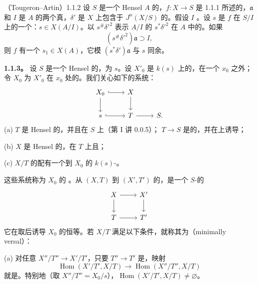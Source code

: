 \begin{SGAresult}{（Tougeron--Artin）}{1.1.2}
设 $S$ 是一个 Hensel  $A$ 的，$f:X\to S$ 是 1.1.1 所述的，$\mathfrak a$ 和 $I$ 是 $A$ 的两个真，$\delta'$ 是 $X$ 上包含于 $J^n(X/S)$ 的。假设 $I$ 。设 $s$ 是 $f$ 在 $S/I$ 上的一个：$s\in X(A/I)$。以 $s^{\#}\delta'^2$ 表示 $A/I$ 的 $s^*\delta'^2$ 在 $A$ 中的。如果
\[
 (s^{\#}\delta'^2)\mathfrak a\supset I,
\]
则 $f$ 有一个 $s_1\in X(A)$，它模 $(s^*\delta')\mathfrak a$ 与 $s$ 同余。
\end{SGAresult}
\textbf{1.1.3。} 设 $S$ 是一个 Hensel 的，为 $s$。设 $X'_0$ 是 $k(s)$ 上的，在一个 $x_0$ 之外；令 $X_0$ 为 $X'_0$ 在 $x_0$ 处的。我们关心如下的系统：
\[
\begin{tikzcd}
X_0\arrow[r,hook]\arrow[d]&X\arrow[d]\\
s\arrow[r,hook]&T\arrow[r]&S .
\end{tikzcd}
\]
(a) $T$ 是 Hensel 的，并且在 $S$ 上（第 I 讲 0.0.5）； $T\to S$ 是的，并在上诱导；

(b) $X$ 是 Hensel 的，在 $T$ 上且；

(c) $X/T$ 的配有一个到 $X_0$ 的 $k(s)$-。

这些系统称为 $X_0$ 的 。从 $(X,T)$ 到 $(X',T')$ 的，是一个 $S$-的
\[
\begin{tikzcd}X\arrow[r]\arrow[d]&X'\arrow[d]\\T\arrow[r]&T'\end{tikzcd}
\]
它在取后诱导 $X_0$ 的恒等。若 $X/T$ 满足以下条件，就称其为（minimally versal）：

(a) 对任意 $X''/T''\to X'/T'$，只要 $T''\to T'$ 是，映射
\[
\operatorname{Hom}(X'/T',X/T)\longrightarrow
\operatorname{Hom}(X''/T'',X/T)
\]
就是。特别地（取 $X''/T''=X_0/s$），$\operatorname{Hom}(X'/T',X/T)\ne\varnothing$。

